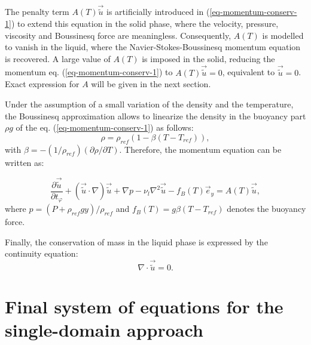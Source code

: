 The penalty term $A(T) \vec{\tilde{u}}$ is artificially introduced in (\ref{eq-momentum-conserv-1}) to extend this equation in the solid phase, where the velocity, pressure, viscosity and Boussinesq force are meaningless.  Consequently, $A(T)$  is modelled to vanish in the liquid, where the Navier-Stokes-Boussinesq momentum equation is recovered. A large value of $A(T)$ is imposed in the solid, reducing the momentum eq. (\ref{eq-momentum-conserv-1})  to $A(T) \vec{\tilde{u}}=0$, equivalent to $\vec{\tilde{u}}=0$. Exact expression for $A$ will be given in the next section.

Under the assumption of a small variation of the density and the temperature, the Boussinesq approximation allows to linearize the density in the buoyancy part $\rho g$ of the eq. (\ref{eq-momentum-conserv-1}) as follows:
\begin{equation}
   \rho = \rho_{ref} (1 - \beta (T-T_{ref})),
\end{equation}
with $\beta = - (1/\rho_{ref}) (\partial \rho / \partial T)$.
Therefore, the momentum equation can be written as:

\begin{equation}\label{eq-momentum-conserv}
  \frac{\partial \vec{\tilde{u}}}{\partial t_{\varphi}} +   {(\vec{\tilde{u}}\cdot\nabla ) \vec{\tilde{u}}} + \nabla p - \nu_{l}  {\nabla^2 \vec{\tilde{u}}} 
- f_B(T) \vec{e}_y= A(T) \vec{\tilde{u}},
\end{equation}
where $p = (P + \rho_{ref} g y)/ \rho_{ref}$ and $f_B(T) = g \beta (T-T_{ref})$ denotes the buoyancy force.

Finally, the conservation of mass in the liquid phase is expressed by the continuity equation:
\begin{equation}\label{eq-mass-conserv}
\nabla \cdot \vec{\tilde{u}} = 0.
\end{equation} 


\section{Final system of equations for the single-domain approach}\label{sec-eq-scaling}

